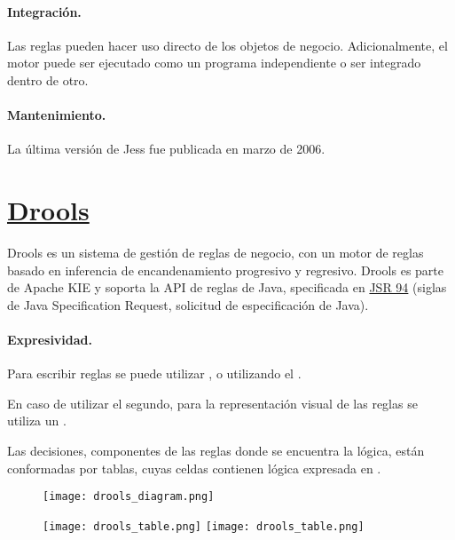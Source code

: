 \paragraph{Integración.}
Las reglas pueden hacer uso directo de los objetos de negocio. Adicionalmente, el motor puede ser ejecutado como un programa independiente o ser integrado dentro de otro.

\paragraph{Mantenimiento.}
La última versión de Jess fue publicada en marzo de 2006.

\section{\href{https://www.drools.org/}{Drools}}
Drools es un sistema de gestión de reglas de negocio, con un motor de reglas basado en inferencia de encandenamiento progresivo y regresivo. Drools es parte de Apache KIE y soporta la API de reglas de Java, specificada en \href{https://www.oracle.com/technical-resources/articles/javase/javarule.html}{JSR 94} (siglas de Java Specification Request, solicitud de especificación de Java).

\paragraph{Expresividad.}
Para escribir reglas se puede utilizar , o utilizando el .

En caso de utilizar el segundo, para la representación visual de las reglas se utiliza un .

Las decisiones, componentes de las reglas donde se encuentra la lógica, están conformadas por tablas, cuyas celdas contienen lógica expresada en .

\begin{center}
	\begin{figure}
		\texttt{[image: drools\_diagram.png]}
	\end{figure}
\end{center}

\begin{center}
	\begin{figure}
		\texttt{[image: drools\_table.png]}
		\texttt{[image: drools\_table.png]}
	\end{figure}
\end{center}

